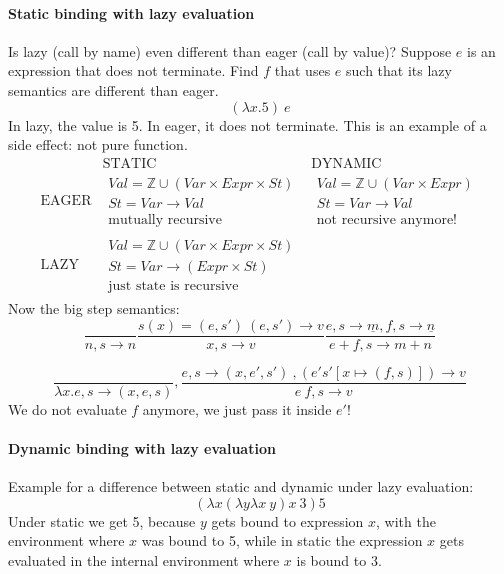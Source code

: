 \documentclass{article}
\begin{document}
\paragraph{Static binding with lazy evaluation}
Is lazy (call by name) even different than eager (call by value)?
Suppose $ e $ is an expression that does not terminate.
Find $ f $ that uses $ e $ such that its lazy semantics are different than eager.
$$ (\lambda x.5)\ e $$
In lazy, the value is 5. In eager, it does not terminate.
This is an example of a side effect: not pure function.
$$
\begin{array}{c|c|c}
& \text{STATIC}& \text{DYNAMIC}\\\hline
	\text{EAGER} &
	\begin{matrix}
		Val=\mathbb{Z}\cup (Var\times Expr\times St)\\
		St=Var\rightarrow Val\\
		\text{mutually recursive}
	\end{matrix} &
	\begin{matrix}
		Val=\mathbb{Z}\cup (Var\times Expr)\\
		St=Var\rightarrow Val\\
		\text{not recursive anymore!}
	\end{matrix}\\\hline
\text{LAZY} &
	\begin{matrix}
		Val=\mathbb{Z}\cup (Var\times Expr\times St)\\
		St=Var\rightarrow (Expr \times St)\\
		\text{just state is recursive}
	\end{matrix} &
\end{array}
$$
Now the big step semantics:
$$\frac{}{n,s\rightarrow n}\frac{s(x)=(e,s')\ (e,s')\rightarrow v}{x,s\rightarrow v}
\frac{e,s\rightarrow\underline{m}, f,s\rightarrow \underline{n}}{e+f,s\rightarrow m+n}$$

$$\frac{}{\lambda x.e,s\rightarrow (x, e,s)},
\frac{e, s\rightarrow (x, e', s')\ , (e's'[x\mapsto (f,s)])\rightarrow v}{e\ f,s\rightarrow v}$$
We do not evaluate $ f $ anymore, we just pass it inside $ e' $!
\paragraph{Dynamic binding with lazy evaluation}
Example for a difference between static and dynamic under lazy evaluation:
$$(\lambda x(\lambda y\lambda x\ y)x\ 3)5$$
Under static we get 5, because $ y $ gets bound to expression $ x $, with the environment where $ x $ was bound to 5, while in static the expression $x$ gets evaluated in the internal environment where $ x $ is bound to 3.
\end{document}
